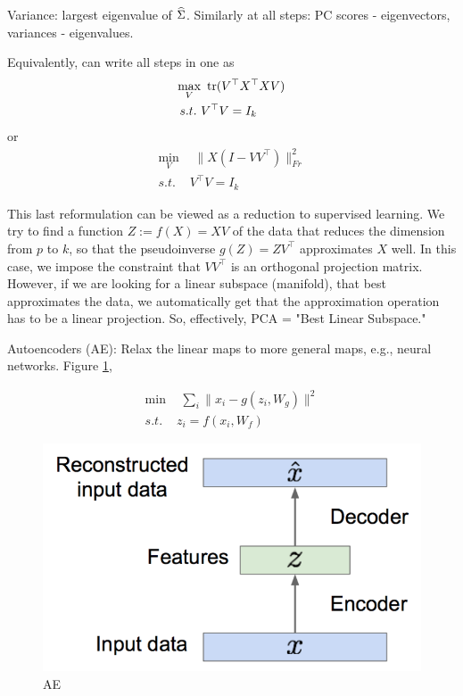 \documentclass[english]{article}
\begin{document}
Variance: largest eigenvalue of $\widehat{\Sigma}$. 
Similarly at all steps: PC scores - eigenvectors, variances - eigenvalues. 

Equivalently, can write all steps in one as 
\begin{align*}
\max_V&\,\, \operatorname{tr} (V^\top X^\top XV)\\
s.t.\,\,&V^\top V=I_k
\end{align*}
or 
\begin{align*}
\min_V&\,\,\|X(I-VV^\top)\|_{Fr}^2\\
s.t.\,\,&V^\top V=I_k
\end{align*}

This last reformulation can be viewed as a reduction to supervised learning. We try to find a function $Z:=f(X)=XV$ of the data that reduces the dimension from $p$ to $k$, so that the pseudoinverse $g(Z) = ZV^\top$ approximates $X$ well. In this case, we impose the constraint that $VV^\top$ is an orthogonal projection matrix. However, if we are looking for a linear subspace (manifold), that best approximates the data, we automatically get that the approximation operation has to be a linear projection. So, effectively, PCA = "Best Linear Subspace."


\item Autoencoders (AE): Relax the linear maps to more general maps, e.g., neural networks.  Figure \ref{ae0},

\begin{align*}
\min&\,\,\sum_i \|x_i-g(z_i,W_g)\|^2\\
s.t.\,\,&z_i = f(x_i,W_f)
\end{align*}

\begin{figure}
  \centering
  \includegraphics[scale=0.5]{ae0.png}
    \caption{AE}
    \label{ae0}
\end{figure}
\end{document}
